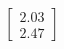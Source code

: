 \documentclass[preview]{standalone}
\begin{document}
\begin{align*}
\begin{bmatrix} 2.03 \\ 2.47 \end{bmatrix}
\end{align*}
\end{document}
